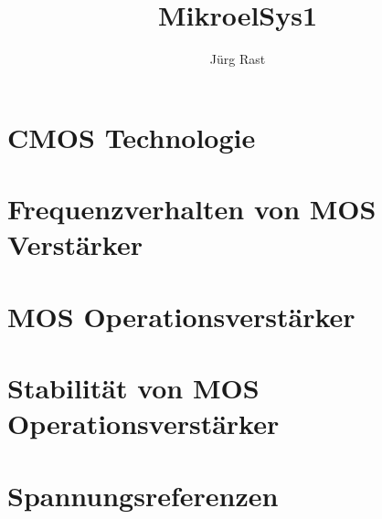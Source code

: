 \documentclass[titlepage=true]{scrartcl}
\title{MikroelSys1}
\author{Jürg Rast}
\begin{document}

\tableofcontents
\newpage

\section{CMOS Technologie}















\section{Frequenzverhalten von MOS Verstärker}

\section{MOS Operationsverstärker}

\section{Stabilität von MOS Operationsverstärker}

%

\section{Spannungsreferenzen}
\end{document}
